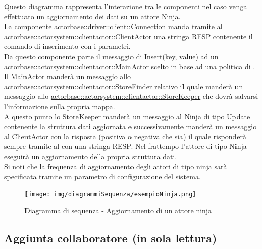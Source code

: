 \documentclass{scalatekids-article}
\begin{document}
Questo diagramma rappresenta l'interazione tra le componenti nel caso venga
effettuato un aggiornamento dei dati su un attore Ninja.\\
La componente \hyperref[sec:actorbase::driver::client::Connection]{actorbase::driver::client::Connection}
manda tramite  al \hyperref[sec:actorbase::actorsystem::clientactor::ClientActor]{actorbase::actorsystem::clientactor::ClientActor}
una stringa \hyperref[sec:RESP]{RESP} contenente il comando di inserimento  con
i parametri.\\
Da questo componente parte il messaggio di Insert(key, value) ad un \hyperref[sec:actorbase::actorsystem::clientactor::MainActor]{actorbase::actorsystem::clientactor::MainActor} scelto in base ad una
politica di . Il MainActor manderà un messaggio allo \hyperref[sec:actorbase::actorsystem::clientactor::StoreFinder]{actorbase::actorsystem::clientactor::StoreFinder} relativo il quale manderà un messaggio allo \hyperref[sec:actorbase::actorsystem::clientactor::StoreKeeper]{actorbase::actorsystem::clientactor::StoreKeeper} che dovrà salvarsi l'informazione
sulla propria mappa.\\
A questo punto lo StoreKeeper manderà un messaggio al Ninja di tipo Update contenente la struttura dati aggiornata e successivamente manderà un
messaggio al ClientActor con la risposta (positiva o negativa che sia)
il quale risponderà sempre tramite  al  con
una stringa RESP.
Nel frattempo l'attore di tipo Ninja eseguirà un aggiornamento della propria struttura dati.\\
Si noti che la frequenza di aggiornamento degli attori di tipo ninja sarà
specificata tramite un parametro di configurazione del sistema.
\begin{figure}[H]
  \begin{center}
    \texttt{[image: img/diagrammiSequenza/esempioNinja.png]}
    \caption{Diagramma di sequenza - Aggiornamento di un attore ninja}
  \end{center}
\end{figure}

\subsection{Aggiunta collaboratore (in sola lettura)}
\end{document}

